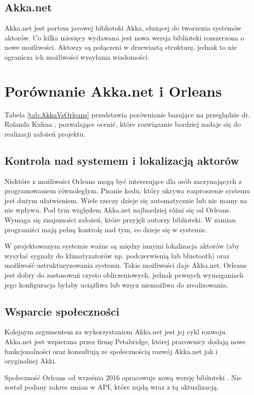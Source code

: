\subsection{Akka.net}
Akka.net jest portem javowej biblioteki Akka, służącej do tworzenia systemów aktorów. 
Co kilka miesięcy wydawana jest nowa wersja biblioteki rozszerzona o nowe możliwości. 
Aktorzy są połączeni w drzewiastą strukturę, jednak to nie ogranicza ich możliwości wysyłania wiadomości. 

\section{Porównanie Akka.net i Orleans}
Tabela \ref{tab:AkkaVsOrleans} przedstawia porównianie bazujące na przeglądzie dr. Rolanda Kuhna \cite{bib:AkkaVsOrleans}, pozwalające ocenić, które rozwiązanie bardziej nadaje się do realizacji założeń projektu.

\subsection*{Kontrola nad systemem i lokalizacją aktorów}
Niektóre z możliwości Orleans mogą być interesujące dla osób zaczynających z programowaniem równoległym. 
Pisanie kodu, który ukrywa rozproszenie systemu jest dużym ułatwieniem. 
Wiele rzeczy dzieje się automatycznie lub nie mamy na nie wpływu. 
Pod tym względem Akka.net najbardziej różni się od Orleans. Wymaga się znajomości założeń, które przyjęli autorzy biblioteki. W zamian programiści mają pełną kontrolę nad tym, co dzieje się w systemie.

W projektowanym systemie ważne są między innymi lokalizacja aktorów (aby wysyłać sygnały do klimatyzatorów np. podczerwienią lub bluetooth) oraz możliwość ustrukturyzowania systemu. 
Takie możliwości daje Akka.net. Orleans jest dobry do zastosowań czysto obliczeniowych, jednak pewnych wymaganiach jego konfiguracja byłaby uciążliwa lub wręcz niemożliwa do zrealizowania.

\subsection*{Wsparcie społeczności}
Kolejnym argumentem za wykorzystaniem Akka.net jest jej cykl rozwoju.
Akka.net jest wspierana przez firmę Petabridge, której pracownicy dodają nowe funkcjonalności oraz konsultują ze społecznością rozwój Akka.net jak i oryginalnej Akki. 

Społeczność Orleans od września 2016 opracowuje nową wersję biblioteki \cite{bib:Orleans2}. Nie został podany zakres zmian w API, które zajdą wraz z tą aktualizacją. 

